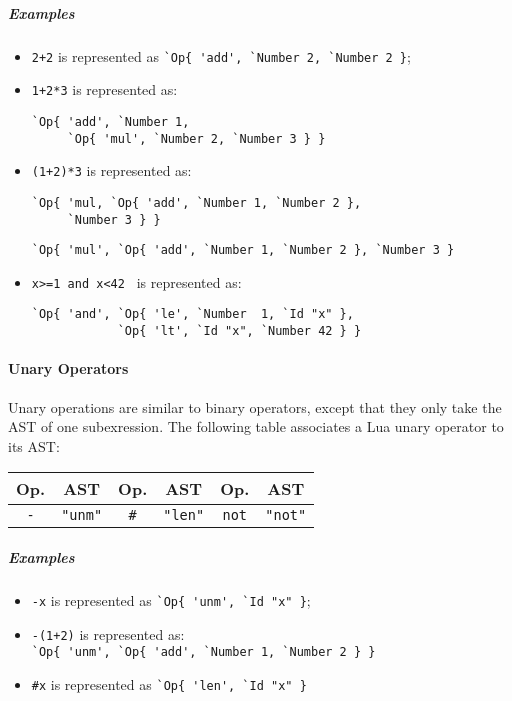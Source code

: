 \subparagraph{Examples}
\begin{itemize}
\item \verb|2+2| is represented as
  \verb|`Op{ 'add', `Number 2, `Number 2 }|;
\item \verb|1+2*3| is represented as:\\[-2em]
\begin{verbatim}
`Op{ 'add', `Number 1, 
     `Op{ 'mul', `Number 2, `Number 3 } }
\end{verbatim}
\item \verb|(1+2)*3| is represented as:\\[-2em]
\begin{verbatim}
`Op{ 'mul, `Op{ 'add', `Number 1, `Number 2 },
     `Number 3 } }
\end{verbatim}

  \verb|`Op{ 'mul', `Op{ 'add', `Number 1, `Number 2 }, `Number 3 }|
\item \verb|x>=1 and x<42 | is represented as:\\[-2em]
\begin{verbatim}
`Op{ 'and', `Op{ 'le', `Number  1, `Id "x" },
            `Op{ 'lt', `Id "x", `Number 42 } }

\end{verbatim}
\end{itemize}

\paragraph{Unary Operators}
Unary operations are similar to binary operators, except that they
only take the AST of one subexression. The following table associates
a Lua unary operator to its AST:

\begin{center}
\begin{tabular}{|c|c||c|c||c|c|}
  \hline
  \bf Op. & \bf AST & 
  \bf Op. & \bf AST & 
  \bf Op. & \bf AST \\
  
  \hline\hline %
  \verb+-+   & \verb+"unm"+ & 
  \verb+#+   & \verb+"len"+ & 
  \verb+not+ & \verb+"not"+ \\
  \hline %
\end{tabular}
\end{center}

\subparagraph{Examples}
\begin{itemize}
\item \verb|-x| is represented as \verb|`Op{ 'unm', `Id "x" }|;
\item \verb|-(1+2)| is represented as:\\
  \verb|`Op{ 'unm', `Op{ 'add', `Number 1, `Number 2 } }|
\item \verb|#x| is represented as
  \verb|`Op{ 'len', `Id "x" }|
\end{itemize}


